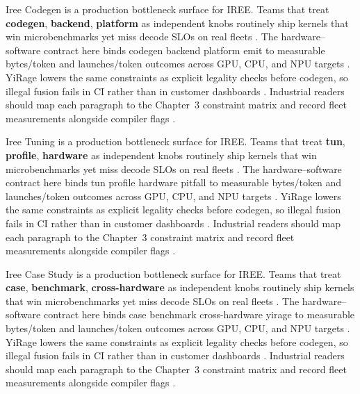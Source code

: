 Iree Codegen is a production bottleneck surface for IREE. Teams that treat \textbf{codegen}, \textbf{backend}, \textbf{platform} as independent knobs routinely ship kernels that win microbenchmarks yet miss decode SLOs on real fleets \citep{semianalysis2024tma,dlbook}. The hardware--software contract here binds codegen backend platform emit to measurable bytes/token and launches/token outcomes across GPU, CPU, and NPU targets \citep{amd2024xdna,dao2022flashattention}. YiRage lowers the same constraints as explicit legality checks before codegen, so illegal fusion fails in CI rather than in customer dashboards \citep{amd2024aie,kwon2023vllm}. Industrial readers should map each paragraph to the Chapter~3 constraint matrix and record fleet measurements alongside compiler flags \citep{dlbook,nvidia2024cudagraphs}.

Iree Tuning is a production bottleneck surface for IREE. Teams that treat \textbf{tun}, \textbf{profile}, \textbf{hardware} as independent knobs routinely ship kernels that win microbenchmarks yet miss decode SLOs on real fleets \citep{amd2024xdna,dao2022flashattention}. The hardware--software contract here binds tun profile hardware pitfall to measurable bytes/token and launches/token outcomes across GPU, CPU, and NPU targets \citep{amd2024aie,kwon2023vllm}. YiRage lowers the same constraints as explicit legality checks before codegen, so illegal fusion fails in CI rather than in customer dashboards \citep{dlbook,nvidia2024cudagraphs}. Industrial readers should map each paragraph to the Chapter~3 constraint matrix and record fleet measurements alongside compiler flags \citep{dao2022flashattention,liu2024deepseekv3}.

Iree Case Study is a production bottleneck surface for IREE. Teams that treat \textbf{case}, \textbf{benchmark}, \textbf{cross-hardware} as independent knobs routinely ship kernels that win microbenchmarks yet miss decode SLOs on real fleets \citep{amd2024aie,kwon2023vllm}. The hardware--software contract here binds case benchmark cross-hardware yirage to measurable bytes/token and launches/token outcomes across GPU, CPU, and NPU targets \citep{dlbook,nvidia2024cudagraphs}. YiRage lowers the same constraints as explicit legality checks before codegen, so illegal fusion fails in CI rather than in customer dashboards \citep{dao2022flashattention,liu2024deepseekv3}. Industrial readers should map each paragraph to the Chapter~3 constraint matrix and record fleet measurements alongside compiler flags \citep{kwon2023vllm,patel2025llminference}.

